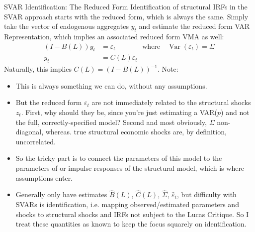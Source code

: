 \documentclass[aspectratio=169, handout]{beamer}
\newcommand{\Var}{\operatorname{Var}}
\begin{document}
{\scriptsize
\begin{frame}{SVAR Identification: The Reduced Form}
Identification of structural IRFs in the SVAR approach starts with the
\alert{reduced form}, which is always the same.
Simply take the vector of endogenous aggregates $y_t$ and estimate the
\alert{reduced form} VAR Representation, which implies an associated
reduced form VMA as well:
\begin{align*}
  (I-B(L))y_t
  &= \varepsilon_t
  \quad
  \;\;\;\qquad\text{where}\quad
  \Var(\varepsilon_t)=\Sigma
  \\
  y_t
  &
  = C(L)\varepsilon_t
\end{align*}
Naturally, this implies $C(L) = (I-B(L))^{-1}$.
Note:
\begin{itemize}
  \item This is \alert{always} something we can do, without any
    assumptions.
  \item But the reduced form $\varepsilon_t$ are \alert{not} immediately
    related to the structural shocks $z_t$.
    First, why should they be, since you're just estimating a VAR($p$)
    and not the full, correctly-specified model?
    Second and most obviously, \alert{$\Sigma$ non-diagonal}, whereas.
    true structural economic shocks are, by definition, uncorrelated.

  \item So the tricky part is to connect the parameters of this model to
    the parameters of or impulse responses of the structural model,
    which is where assumptions enter.

  \item Generally only have estimates $\hat{B}(L)$, $\hat{C}(L)$,
    $\hat{\Sigma}$, $\hat{\varepsilon}_t$, but \alert{difficulty} with SVARs is
    \alert{identification}, i.e. \alert{mapping} observed/estimated
    parameters and shocks to structural shocks and IRFs not subject to
    the Lucas Critique. So I treat these quantities as known to keep the
    focus squarely on identification.
\end{itemize}
\end{frame}
}
\end{document}
